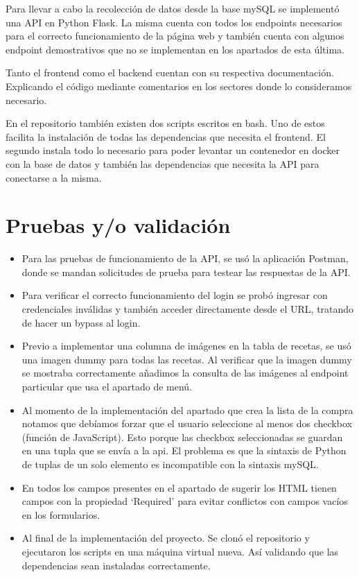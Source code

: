 \documentclass[a4paper,11pt]{article}
\begin{document}
Para llevar a cabo la recolección de datos desde la base mySQL se implementó una API en Python Flask. La misma cuenta con todos los endpoints necesarios para el correcto funcionamiento de la página web y también cuenta con algunos endpoint demostrativos que no se implementan en los apartados de esta última.

Tanto el frontend como el backend cuentan con su respectiva documentación. Explicando el código mediante comentarios en los sectores donde lo consideramos necesario.

En el repositorio también existen dos scripts escritos en bash. Uno de estos facilita la instalación de todas las dependencias que necesita el frontend. El segundo instala todo lo necesario para poder levantar un contenedor en docker con la base de datos y también las dependencias que necesita la API para conectarse a la misma.
\section*{Pruebas y/o validación}
\begin{itemize}
    \item Para las pruebas de funcionamiento de la API, se usó la aplicación Postman, donde se mandan solicitudes de prueba para testear las respuestas de la API.
    \item Para verificar el correcto funcionamiento del login se probó ingresar con credenciales inválidas y también acceder directamente desde el URL, tratando de hacer un bypass al login.
    \item Previo a implementar una columna de imágenes en la tabla de recetas, se usó una imagen dummy para todas las recetas. Al verificar que la imagen dummy se mostraba correctamente  añadimos la consulta de las imágenes al endpoint particular que usa el apartado de menú.
    \item Al momento de la implementación del apartado que crea la lista de la compra notamos que debíamos forzar que el usuario seleccione al menos dos checkbox (función de JavaScript). Esto porque las checkbox seleccionadas se guardan en una tupla que se envía a la api. El problema es que la sintaxis de Python de tuplas de un solo elemento es incompatible con la sintaxis mySQL.
    \item En todos los campos presentes en el apartado de sugerir los HTML tienen campos con la propiedad ‘Required’ para evitar conflictos con campos vacíos en los formularios.
    \item Al final de la implementación del proyecto. Se clonó el repositorio y ejecutaron los scripts en una máquina virtual nueva. Así validando que las dependencias sean instaladas correctamente.
\end{itemize}
\end{document}
